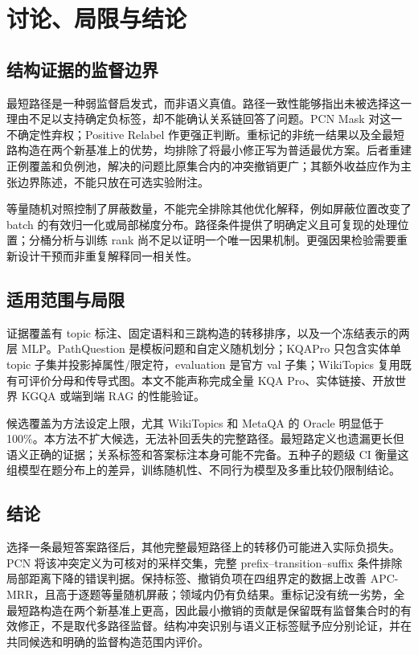 \documentclass[UTF8,a4paper,10pt,fontset=fandol]{ctexart}
\begin{document}
\section{讨论、局限与结论}
\subsection{结构证据的监督边界}
最短路径是一种弱监督启发式，而非语义真值。路径一致性能够指出未被选择这一理由不足以支持确定负标签，却不能确认关系链回答了问题。PCN Mask 对这一不确定性弃权；Positive Relabel 作更强正判断。重标记的非统一结果以及全最短路构造在两个新基准上的优势，均排除了将最小修正写为普适最优方案。后者重建正例覆盖和负例池，解决的问题比原集合内的冲突撤销更广；其额外收益应作为主张边界陈述，不能只放在可选实验附注。

等量随机对照控制了屏蔽数量，不能完全排除其他优化解释，例如屏蔽位置改变了 batch 的有效归一化或局部梯度分布。路径条件提供了明确定义且可复现的处理位置；分桶分析与训练 rank 尚不足以证明一个唯一因果机制。更强因果检验需要重新设计干预而非重复解释同一相关性。

\subsection{适用范围与局限}
证据覆盖有 topic 标注、固定语料和三跳构造的转移排序，以及一个冻结表示的两层 MLP。PathQuestion 是模板问题和自定义随机划分；KQAPro 只包含实体单 topic 子集并投影掉属性/限定符，evaluation 是官方 val 子集；WikiTopics 复用既有可评价分母和传导式图。本文不能声称完成全量 KQA Pro、实体链接、开放世界 KGQA 或端到端 RAG 的性能验证。

候选覆盖为方法设定上限，尤其 WikiTopics 和 MetaQA 的 Oracle 明显低于 100\%。本方法不扩大候选，无法补回丢失的完整路径。最短路定义也遗漏更长但语义正确的证据；关系标签和答案标注本身可能不完备。五种子的题级 CI 衡量这组模型在题分布上的差异，训练随机性、不同行为模型及多重比较仍限制结论。

\subsection{结论}
选择一条最短答案路径后，其他完整最短路径上的转移仍可能进入实际负损失。PCN 将该冲突定义为可核对的采样交集，完整 prefix--transition--suffix 条件排除局部距离下降的错误判据。保持标签、撤销负项在四组界定的数据上改善 APC-MRR，且高于逐题等量随机屏蔽；领域内仍有负结果。重标记没有统一劣势，全最短路构造在两个新基准上更高，因此最小撤销的贡献是保留既有监督集合时的有效修正，不是取代多路径监督。结构冲突识别与语义正标签赋予应分别论证，并在共同候选和明确的监督构造范围内评价。
\end{document}
